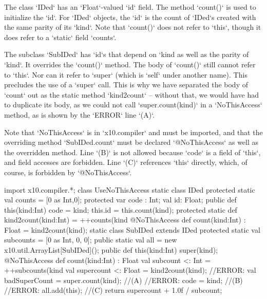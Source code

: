 \begin{ex}

The class \xcd`IDed` has an \xcd`Float`-valued \xcd`id` field.  The method
\xcd`count()` is used to initialize the \xcd`id`.  For \xcd`IDed` objects,
the \xcd`id` is the count of \xcd`IDed`s created with the same parity of its
\xcd`kind`.   Note that \xcd`count()` does not refer to \xcd`this`, though
it does refer to a \xcd`static` field \xcd`counts`. 

The subclass \xcd`SubIDed` has \xcd`id`s that depend on \xcd`kind%
as well as the parity of \xcd`kind`.  It overrides the \xcd`count()`
method.  The body of \xcd`count()` still cannot refer to \xcd`this`.
Nor can it refer to \xcd`super` (which is \xcd`self` under another name).
This precludes the use of a \xcd`super` call.  This is why we have separated
the body of \xcd`count` out as the static method \xcd`kind2count` -- without
that, we would have had to duplicate its body, as we could not call 
\xcd`super.count(kind)` in a \xcd`NoThisAccess` method, as is shown by 
the \xcd`ERROR` line \xcd`(A)`. 

Note that \xcd`NoThisAccess` is in \xcd`x10.compiler` and must be imported,
and that the overriding method \xcd`SubIDed.count` must be declared
\xcd`@NoThisAccess` as well as the overridden method.
Line \xcd`(B)` is not allowed because \xcd`code` is a field of \xcd`this`, 
and field accesses are forbidden.   Line \xcd`(C)` references \xcd`this`
directly, which, of course, is forbidden by \xcd`@NoThisAccess`.  


\begin{xten}
import x10.compiler.*;
class UseNoThisAccess {
  static class IDed {
    protected static val counts = [0 as Int,0];
    protected var code : Int;
    val id: Float;
    public def this(kind:Int) { 
      code = kind;
      this.id = this.count(kind); 
    }
    protected static def kind2count(kind:Int) = ++counts(kind %
    @NoThisAccess def count(kind:Int) : Float = kind2count(kind);
  }
  static class SubIDed extends IDed {
    protected static val subcounts = [0 as Int, 0, 0];
    public static val all = new x10.util.ArrayList[SubIDed]();
    public def this(kind:Int) { 
       super(kind); 
    }
    @NoThisAccess
    def count(kind:Int) : Float {
       val subcount <: Int = ++subcounts(kind %
       val supercount <: Float = kind2count(kind);
       //ERROR: val badSuperCount = super.count(kind); //(A)
       //ERROR: code = kind;                           //(B)
       //ERROR: all.add(this);                         //(C)
       return  supercount + 1.0f / subcount;
    }
  }
}
\end{xten}
%


\end{ex}


